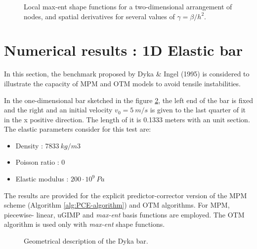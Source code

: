 \begin{figure}
{    %
    \label{fig:LME_5.0_Shape_Fun_dx}
  }
  \caption{Local max-ent shape functions for a two-dimensional
    arrangement of nodes, and spatial derivatives for several values
    of $\gamma = \beta/h^2$.}
  \label{fig:LME_MPM}
\end{figure}

\section{Numerical results : 1D Elastic bar}
\label{sec:dynamic-benchmark}

In this section, the benchmark proposed by Dyka \& Ingel
(1995)\cite{Dyka1995} is considered to illustrate the
capacity of MPM \cite{Sulsky1994} and OTM
models to avoid tensile instabilities. 

In the one-dimensional bar sketched in
the figure \ref{fig:Dyka_Bar}, the left end of the bar is fixed and
the right and an initial velocity $v_0 = 5\ m/s$ is given to the last
quarter of it in the x positive direction. The length of it is 0.1333
meters with an unit section. The elastic parameters consider for this
test are:
\begin{itemize} 
\item  Density : $7833\ kg/m3$
\item  Poisson ratio : $0$
\item  Elastic modulus : $200 \cdot 10^9\ Pa$
\end{itemize}

The results are provided for the explicit predictor-corrector version of the
MPM scheme (Algorithm \ref{alg:PCE-algorithm}) and OTM algorithms. For MPM, piecewise-
linear, uGIMP and \textit{max-ent} basis functions are employed. The OTM
algorithm is used only with \textit{max-ent} shape functions. 

\begin{figure}\sidecaption
  \centering
  \resizebox{0.8\hsize}{!}{
    }
  \caption{Geometrical description of the Dyka \cite{Dyka1995} bar. }
  \label{fig:Dyka_Bar}
\end{figure}

